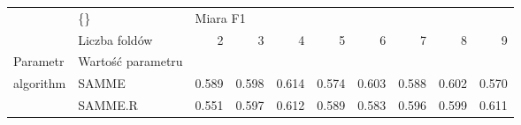 \begin{tabular}{llrrrrrrrr}
\hline
          & \{\} & \multicolumn{8}{l}{Miara F1} \\
          & Liczba foldów &        2 &      3 &      4 &      5 &      6 &      7 &      8 &      9 \\
Parametr & Wartość parametru &          &        &        &        &        &        &        &        \\
\hline
algorithm & SAMME &    0.589 &  0.598 &  0.614 &  0.574 &  0.603 &  0.588 &  0.602 &  0.570 \\
          & SAMME.R &    0.551 &  0.597 &  0.612 &  0.589 &  0.583 &  0.596 &  0.599 &  0.611 \\
\hline
\end{tabular}
